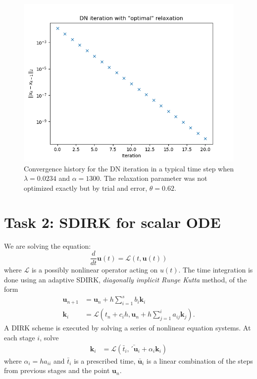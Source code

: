 \documentclass[]{article}
\begin{document}
\begin{figure}
	\includegraphics[width=0.9\linewidth]{dirichlet_neumann.png}
	\caption{\label{dn} Convergence history for the DN iteration in a typical time step when $\lambda=0.0234$ and $\alpha=1300$. The relaxation parameter was not optimized exactly but by trial and error, $\theta=0.62$.}
\end{figure}

\newpage

\section{Task 2: SDIRK for scalar ODE}

We are solving the equation:
\begin{equation}
\frac{d}{dt}\mathbf{u}(t) = \mathcal{L}(t, \mathbf{u}(t))
\end{equation}
where $\mathcal{L}$ is a possibly nonlinear operator acting on $u(t)$.
The time integration is done using an adaptive SDIRK, \textit{diagonally implicit Runge Kutta} method, of the form
\begin{align}
\mathbf{u}_{n+1} &= \mathbf{u}_n + h \sum_{i=1}^{s} b_i\mathbf{k}_i \\
\mathbf{k}_i &= \mathcal{L}(t_n + c_i h, \mathbf{u}_n + h\sum_{j=1}^{i} a_{ij} \mathbf{k}_j).
\end{align}
A DIRK scheme is executed by solving a series of nonlinear equation systems. At each stage $i$, solve
\begin{align}
\label{eq:stage}
\mathbf{k}_i &= \mathcal{L}(\bar{t}_i, \bar{´\mathbf{u}}_i + \alpha_i \mathbf{k}_i)
\end{align}
where $\alpha_i = h a_{ii}$ and $\bar{t}_i$ is a prescribed time, $\bar{\mathbf{u}}_i$ is a linear combination of the steps from previous stages and the point $\mathbf{u}_n$.
\end{document}
